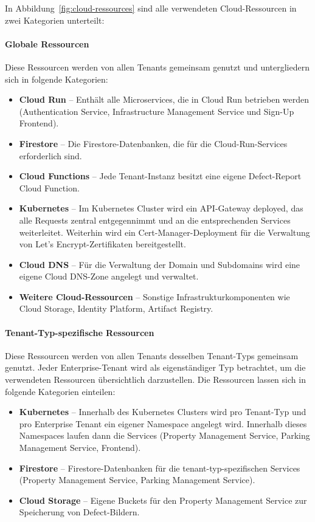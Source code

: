 In Abbildung~\ref{fig:cloud-ressources} sind alle verwendeten Cloud-Ressourcen in zwei Kategorien unterteilt:
\paragraph{Globale Ressourcen}
Diese Ressourcen werden von allen Tenants gemeinsam genutzt und untergliedern sich in folgende Kategorien:
\begin{itemize}
	\item \textbf{Cloud Run} -- Enthält alle Microservices, die in Cloud Run betrieben werden (Authentication Service, Infrastructure Management Service und Sign-Up Frontend).
	\item \textbf{Firestore} -- Die Firestore-Datenbanken, die für die Cloud-Run-Services erforderlich sind.
	\item \textbf{Cloud Functions} -- Jede Tenant-Instanz besitzt eine eigene Defect-Report Cloud Function.
	\item \textbf{Kubernetes} -- Im Kubernetes Cluster wird ein API-Gateway deployed, das alle Requests zentral entgegennimmt und an die entsprechenden Services weiterleitet. Weiterhin 
	wird ein Cert-Manager-Deployment für die Verwaltung von Let's Encrypt-Zertifikaten bereitgestellt.
  \item \textbf{Cloud DNS} -- Für die Verwaltung der Domain und Subdomains wird eine eigene Cloud DNS-Zone angelegt und verwaltet.
	\item \textbf{Weitere Cloud-Ressourcen} -- Sonstige Infrastrukturkomponenten wie Cloud Storage, Identity Platform, Artifact Registry.
\end{itemize}

\paragraph{Tenant-Typ-spezifische Ressourcen}
Diese Ressourcen werden von allen Tenants desselben Tenant-Typs gemeinsam genutzt. Jeder Enterprise-Tenant wird als eigenständiger Typ betrachtet, um die verwendeten Ressourcen übersichtlich darzustellen. Die Ressourcen lassen sich in folgende Kategorien einteilen:
\begin{itemize}
	\item \textbf{Kubernetes} -- Innerhalb des Kubernetes Clusters wird pro Tenant-Typ und pro Enterprise Tenant ein eigener Namespace angelegt wird. 
  Innerhalb dieses Namespaces laufen dann die Services (Property Management Service, Parking Management Service, Frontend).
	\item \textbf{Firestore} -- Firestore-Datenbanken für die tenant-typ-spezifischen Services (Property Management Service, Parking Management Service).
	\item \textbf{Cloud Storage} -- Eigene Buckets für den Property Management Service zur Speicherung von Defect-Bildern.
\end{itemize}

